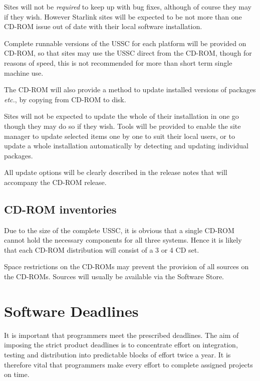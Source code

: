 \documentclass[twoside,11pt]{article}
\newcommand{\xlabel}[1]{}
\begin{document}
Sites will not be \emph{required}\/ to keep up with bug fixes, although
of course they may if they wish.  However Starlink sites will be
expected to be not more than one CD-ROM issue out of date with their
local software installation.

Complete runnable versions of the USSC for each platform will be
provided on CD-ROM, so that sites may use the USSC direct from the
CD-ROM, though for reasons of speed, this is not recommended for more than
short term single machine use.

The CD-ROM will also provide a method to update installed versions of
packages \emph{etc.}, by copying from CD-ROM to disk.

Sites will not be expected to update the whole of their installation in
one go though they may do so if they wish.  Tools will be provided to
enable the site manager to update selected items one by one to suit
their local users, or to update a whole installation automatically by
detecting and updating individual packages.

All update options will be clearly described in the release notes that
will accompany the CD-ROM release.

\subsection{\label{cdrom_inventories}\xlabel{cdrom_inventories}CD-ROM inventories}

Due to the size of the complete USSC, it is obvious that a single CD-ROM
cannot hold the necessary components for all three systems.  Hence it is
likely that each CD-ROM distribution will consist of a 3 or 4 CD set.

Space restrictions on the CD-ROMs may prevent the provision of all
sources on the CD-ROMs.  Sources will usually be available via the
Software Store.

\section{\label{software_deadlines}\xlabel{software_deadlines}Software Deadlines}

It is important that programmers meet the prescribed deadlines.  The aim
of imposing the strict product deadlines is to concentrate effort on
integration, testing and distribution into predictable blocks of effort
twice a year.  It is therefore vital that programmers make every effort to
complete assigned projects on time.
\end{document}
